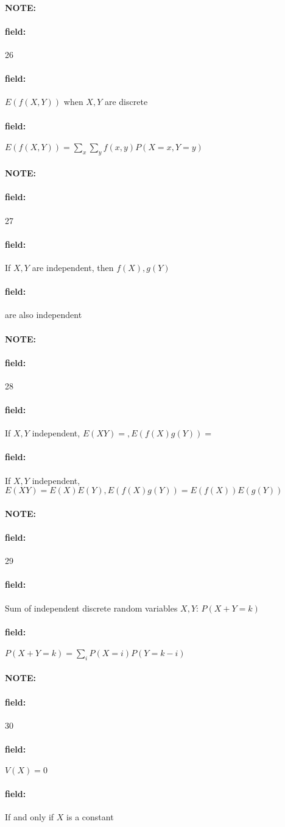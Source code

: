 \documentclass[12pt]{article}
\newenvironment{note}{\paragraph{NOTE:}}{}
\newenvironment{field}{\paragraph{field:}}{}
\begin{document}


\begin{note}
  \begin{field}
    \tiny 26
  \end{field}
  \begin{field}
    $E(f(X,Y))$ when $X,Y$ are discrete
  \end{field}
  \begin{field}
    $E(f(X,Y)) = \sum_x \sum_y f(x,y)P(X=x,Y=y)$
  \end{field}
\end{note}


\begin{note}
  \begin{field}
    \tiny 27
  \end{field}
  \begin{field}
    If $X,Y$ are independent, then $f(X),g(Y)$
  \end{field}
  \begin{field}
    are also independent
  \end{field}
\end{note}

\begin{note}
  \begin{field}
    \tiny 28
  \end{field}
  \begin{field}
    If $X,Y$ independent, $E(XY) = , E(f(X)g(Y)) = $
  \end{field}
  \begin{field}
    If $X,Y$ independent, $E(XY) = E(X)E(Y), E(f(X)g(Y)) = E(f(X))E(g(Y))$
  \end{field}
\end{note}

\begin{note}
  \begin{field}
    \tiny 29
  \end{field}
  \begin{field}
    Sum of independent discrete random variables $X,Y$: $P(X+Y = k)$
  \end{field}
  \begin{field}
    $P(X+Y = k) = \sum_i P(X=i)P(Y=k-i)$
  \end{field}
\end{note}

\begin{note}
  \begin{field}
    \tiny 30
  \end{field}
  \begin{field}
    $V(X) = 0$
  \end{field}
  \begin{field}
    If and only if $X $ is a constant
  \end{field}
\end{note}
\end{document}

